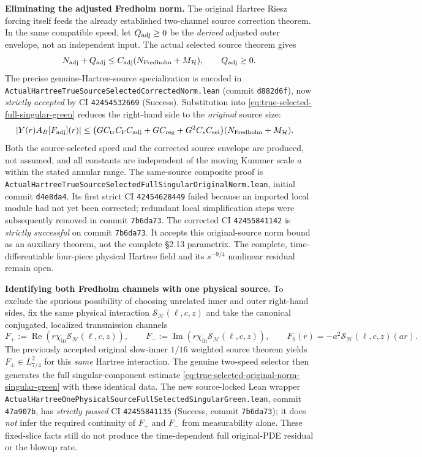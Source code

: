 \documentclass[11pt]{amsart}
\newcommand{\HH}{\mathcal H}
\DeclareMathOperator{\Ree}{Re}
\begin{document}
\medskip
\noindent\textbf{Eliminating the adjusted Fredholm norm.}
The original Hartree Riesz forcing itself feeds the already established
two-channel source correction theorem.  In the same compatible speed,
let \(Q_{\rm adj}\ge0\) be the \emph{derived} adjusted outer envelope,
not an independent input.  The actual selected source theorem gives
\[
 N_{\rm adj}+Q_{\rm adj}\le C_{\rm adj}
                  (N_{\rm Fredholm}+M_{\HH}),
 \qquad Q_{\rm adj}\ge0.
\]
The precise genuine-Hartree-source specialization is encoded in
\texttt{ActualHartreeTrueSourceSelectedCorrectedNorm.lean}
(commit \texttt{d882d6f}), now \emph{strictly accepted}
by CI \texttt{42454532669} (Success).
Substitution into \eqref{eq:true-selected-full-singular-green}
reduces the right-hand side to the \emph{original} source size:
\begin{align}
 |Y(r)A_B[F_{\rm adj}](r)|
 &\le \bigl(GC_{\rm tr}C_{\rm F}C_{\rm adj}
            +GC_{\rm reg}+G^2C_sC_{\rm sel}\bigr)
         (N_{\rm Fredholm}+M_{\HH}).
 \label{eq:true-selected-original-norm-singular-green}
\end{align}
Both the source-selected speed and the corrected source envelope are
produced, not assumed, and all constants are independent of the
moving Kummer scale \(a\) within the stated annular range.
The same-source composite proof is
\texttt{ActualHartreeTrueSourceSelectedFullSingularOriginalNorm.lean},
initial commit \texttt{d4e8da4}.  Its first strict CI
\texttt{42454628449} failed because an imported local module
had not yet been corrected; redundant local simplification steps
were subsequently removed in commit \texttt{7b6da73}.
The corrected CI \texttt{42455841142} is \emph{strictly successful}
on commit \texttt{7b6da73}. It accepts this original-source norm
bound as an auxiliary theorem, not the complete \S2.13 parametrix.
The complete, time-differentiable four-piece physical Hartree field and
its \(s^{-9/4}\) nonlinear residual remain open.


\medskip
\noindent\textbf{Identifying both Fredholm channels with one physical source.}
To exclude the spurious possibility of choosing unrelated inner and
outer right-hand sides, fix the same physical interaction
\(\mathcal S_{\HH}(\ell,c,z)\) and take the canonical conjugated,
localized transmission channels
\[
 F_+:=\Ree\!\left(r\chi_{\mathrm{in}}\mathcal S_{\HH}(\ell,c,z)\right),
 \qquad
 F_-:=\operatorname{Im}\!\left(r\chi_{\mathrm{in}}
                         \mathcal S_{\HH}(\ell,c,z)\right),
 \qquad
 F_0(r)=-a^2\mathcal S_{\HH}(\ell,c,z)(ar).
\]
The previously accepted original slow-inner \(1/16\) weighted
source theorem yields \(F_\pm\in L^2_{7/4}\) for this \emph{same}
Hartree interaction. The genuine two-speed selector then
generates the full singular-component estimate
\eqref{eq:true-selected-original-norm-singular-green}
with these identical data.
The new source-locked Lean wrapper
\texttt{ActualHartreeOnePhysicalSourceFullSelectedSingularGreen.lean},
commit \texttt{47a907b}, has \emph{strictly passed}
CI \texttt{42455841135} (Success, commit \texttt{7b6da73});
it does \emph{not} infer the required continuity of \(F_+\) and
\(F_-\) from measurability alone.
These fixed-slice facts still do not produce the
time-dependent full original-PDE residual or the blowup rate.
\end{document}
